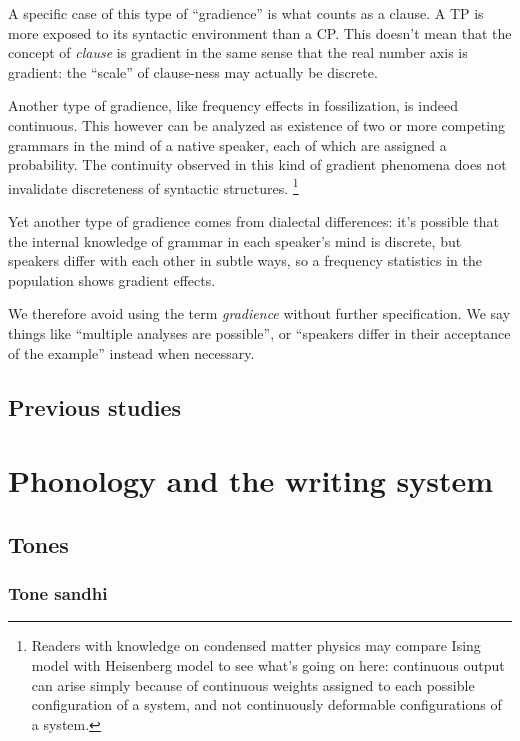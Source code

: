 \documentclass[UTF8, a4paper, oneside, scheme=plain, 12pt]{ctexrep}
\newcommand*{\term}[1]{\emph{#1}}
\begin{document}
{A specific case of this type of ``gradience'' is what counts as a clause.
A TP is more exposed to its syntactic environment than a CP.
This doesn't mean that the concept of \term{clause} is gradient
in the same sense that the real number axis is gradient:
the ``scale'' of clause-ness may actually be discrete.

Another type of gradience, like frequency effects in fossilization, is indeed continuous.
This however can be analyzed as existence of two or more competing grammars in the mind of a native speaker,
each of which are assigned a probability.
The continuity observed in this kind of gradient phenomena
does not invalidate discreteness of syntactic structures.%
\footnote{
    Readers with knowledge on condensed matter physics may compare Ising model with Heisenberg model
    to see what's going on here:
    continuous output can arise simply because of continuous weights assigned to each possible configuration of a system,
    and not continuously deformable configurations of a system.
}

Yet another type of gradience comes from dialectal differences:
it's possible that the internal knowledge of grammar in each speaker's mind is discrete,
but speakers differ with each other in subtle ways,
so a frequency statistics in the population shows gradient effects.

We therefore avoid using the term \term{gradience} without further specification.
We say things like ``multiple analyses are possible'', or ``speakers differ in their acceptance of the example'' instead when necessary.

}

\section{Previous studies}

\chapter{Phonology and the writing system}

\section{Tones}

\subsection{Tone sandhi}\label{sec:phonology.tone-sandhi}
\end{document}
